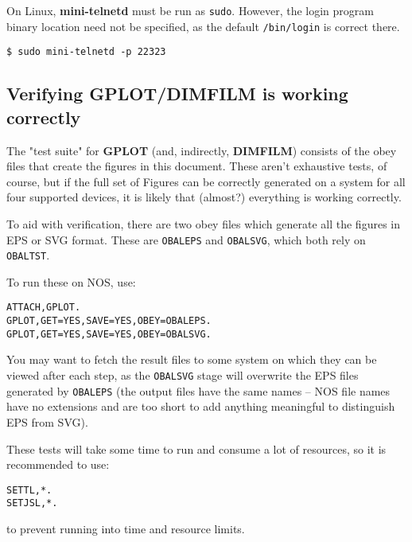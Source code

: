 \documentclass[a4paper,twoside,11pt]{article}
\newcommand{\newpara}{\par\vspace{4mm}\noindent}
\begin{document}
\newpara
On Linux, \textbf{mini-telnetd} must be run as \texttt{sudo}. However, the login program binary location need not be specified,
as the default \texttt{/bin/login} is correct there.
\begin{lstlisting}
$ sudo mini-telnetd -p 22323 
\end{lstlisting}

\subsection{Verifying GPLOT/DIMFILM is working correctly}

The "test suite" for \textbf{GPLOT} (and, indirectly, \textbf{DIMFILM}) consists of the obey files that
create the figures in this document. These aren't exhaustive tests, of course, but
if the full set of Figures can be correctly generated on a system for all four
supported devices, it is likely that (almost?) everything is working correctly.

\newpara
To aid with verification, there are two obey files which generate all the figures
in EPS or SVG format. These are \texttt{OBALEPS} and \texttt{OBALSVG},
which both rely on \texttt{OBALTST}.

\newpara
To run these on NOS, use:
\begin{lstlisting}
ATTACH,GPLOT.
GPLOT,GET=YES,SAVE=YES,OBEY=OBALEPS.
GPLOT,GET=YES,SAVE=YES,OBEY=OBALSVG.
\end{lstlisting}

\newpara
You may want to fetch the result files to some system on which they can be
viewed after each step, as the \texttt{OBALSVG} stage will overwrite the EPS files
generated by \texttt{OBALEPS} (the output files have the same names -- NOS file names
have no extensions and are too short to add anything meaningful to distinguish 
EPS from SVG).

\newpara
These tests will take some time to run and consume a lot of resources, so
it is recommended to use:
\begin{lstlisting}
SETTL,*.
SETJSL,*.
\end{lstlisting}
to prevent running into time and resource limits.
\end{document}
